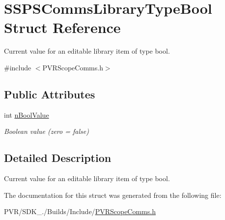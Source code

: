 \hypertarget{struct_s_s_p_s_comms_library_type_bool}{\section{S\+S\+P\+S\+Comms\+Library\+Type\+Bool Struct Reference}
\label{struct_s_s_p_s_comms_library_type_bool}
}


Current value for an editable library item of type bool.  




{\ttfamily \#include $<$P\+V\+R\+Scope\+Comms.\+h$>$}

\subsection*{Public Attributes}
\begin{DoxyCompactItemize}
\item 
\hypertarget{struct_s_s_p_s_comms_library_type_bool_af756d79dad5c0c70668a7f786ec9a0f4}{int \hyperlink{struct_s_s_p_s_comms_library_type_bool_af756d79dad5c0c70668a7f786ec9a0f4}{n\+Bool\+Value}}\label{struct_s_s_p_s_comms_library_type_bool_af756d79dad5c0c70668a7f786ec9a0f4}

\begin{DoxyCompactList}\small\item\em Boolean value (zero = false) \end{DoxyCompactList}\end{DoxyCompactItemize}


\subsection{Detailed Description}
Current value for an editable library item of type bool. 



 

The documentation for this struct was generated from the following file\+:\begin{DoxyCompactItemize}
\item 
P\+V\+R/\+S\+D\+K\+\_./\+Builds/\+Include/\hyperlink{_p_v_r_scope_comms_8h}{P\+V\+R\+Scope\+Comms.\+h}\end{DoxyCompactItemize}
